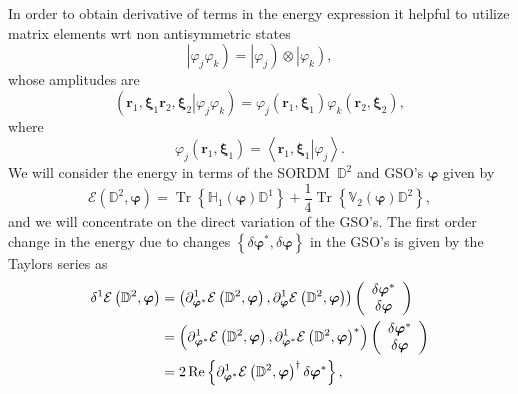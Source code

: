 \documentclass[aps,preprint]{revtex4}%
\begin{document}
In order to obtain derivative of terms in the energy expression it helpful to
utilize matrix elements wrt non antisymmetric states
\begin{equation}
\left\vert \varphi_{j}\varphi_{k}\right)  =\left\vert \varphi_{j}\right)
\otimes\left\vert \varphi_{k}\right)  ,
\end{equation}
whose amplitudes are
\begin{equation}
\left(  \left.  \bm{r}_{1}\bm{,\xi}_{1}\bm{r}_{2}\bm{,\xi}_{2}\right\vert
\varphi_{j}\varphi_{k}\right)  =\varphi_{j}\left(  \bm{r}_{1}\bm{,\xi}_{1}%
\right)  \varphi_{k}\left(  \bm{r}_{2}\bm{,\xi}_{2}\right)  ,
\end{equation}
where
\begin{equation}
\varphi_{j}\left(  \bm{r}_{1}\bm{,\xi}_{1}\right)  =\left\langle \left.
\bm{r}_{1}\bm{,\xi}_{1}\right\vert \varphi_{j}\right\rangle .
\end{equation}
We will consider the energy in terms of the SORDM\ $\mathbb{D}^{2}$ and GSO's
$\bm{\varphi}$ given by
\begin{equation}
\mathcal{E}\left(  \mathbb{D}^{2},\bm{\varphi}\right)  =\operatorname{Tr}%
\left\{  \mathbb{H}_{1}\left(  \bm{\varphi}\right)  \mathbb{D}^{1}\right\}
+\frac{1}{4}\operatorname{Tr}\left\{  \mathbb{V}_{2}\left(
\bm{\varphi}\right)  \mathbb{D}^{2}\right\}  , \label{e1}%
\end{equation}
and we will concentrate on the direct variation of the GSO's. The first order
change in the energy due to changes $\left\{  \delta\bm{\varphi}^{\ast}%
,\delta\bm{\varphi}\right\}  $ in the GSO's is given by the Taylors series as
\begin{align}
\delta^{1}\mathcal{E}\left(  \mathbb{D}^{2},\bm{\varphi}\right)   &  =\left(
\partial_{\bm{\varphi}^{\ast}}^{1}\mathcal{E}\left(  \mathbb{D}^{2}%
,\bm{\varphi}\right)  ,\partial_{\bm{\varphi}}^{1}\mathcal{E}\left(
\mathbb{D}^{2},\bm{\varphi}\right)  \right)  \left(
\begin{array}
[c]{c}%
\delta\bm{\varphi}^{\ast}\\
\delta\bm{\varphi}
\end{array}
\right) \nonumber\\
&  =\left(  \partial_{\bm{\varphi}^{\ast}}^{1}\mathcal{E}\left(
\mathbb{D}^{2},\bm{\varphi}\right)  ,\partial_{\bm{\varphi}^{\ast}}%
^{1}\mathcal{E}\left(  \mathbb{D}^{2},\bm{\varphi}\right)  ^{\ast}\right)
\left(
\begin{array}
[c]{c}%
\delta\bm{\varphi}^{\ast}\\
\delta\bm{\varphi}
\end{array}
\right) \nonumber\\
&  =2\operatorname{Re}\left\{  \partial_{\bm{\varphi}^{\ast}}^{1}%
\mathcal{E}\left(  \mathbb{D}^{2},\bm{\varphi}\right)  ^{\dagger}%
\delta\bm{\varphi}^{\ast}\right\}  ,
\end{align}
\end{document}
